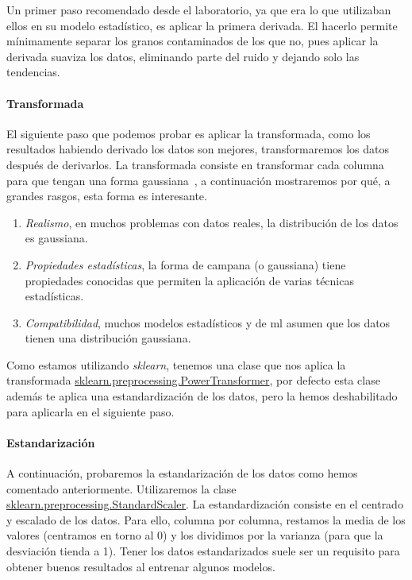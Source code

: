 Un primer paso recomendado desde el laboratorio, ya que era lo que utilizaban ellos en su modelo estadístico, es aplicar la primera derivada. El hacerlo permite mínimamente separar los granos contaminados de los que no, pues aplicar la derivada suaviza los datos, eliminando parte del ruido y dejando solo las tendencias.


\paragraph{Transformada}

El siguiente paso que podemos probar es aplicar la transformada, como los resultados habiendo derivado los datos son mejores, transformaremos los datos después de derivarlos. La transformada consiste en transformar cada columna para que tengan una forma gaussiana\ \cite{sklearnp39:online}, a continuación mostraremos por qué, a grandes rasgos, esta forma es interesante. \cite{TheRoleo87:online}

\begin{enumerate}
    \item \textit{Realismo}, en muchos problemas con datos reales, la distribución de los datos es gaussiana.
    \item \textit{Propiedades estadísticas}, la forma de campana (o gaussiana) tiene propiedades conocidas que permiten la aplicación de varias técnicas estadísticas.
    \item \textit{Compatibilidad}, muchos modelos estadísticos y de \gls{ml} asumen que los datos tienen una distribución gaussiana.
\end{enumerate}

Como estamos utilizando \textit{sklearn}, tenemos una clase que nos aplica la transformada \href{https://scikit-learn.org/stable/modules/generated/sklearn.preprocessing.PowerTransformer.html}{sklearn.preprocessing.PowerTransformer}, por defecto esta clase además te aplica una estandardización de los datos, pero la hemos deshabilitado para aplicarla en el siguiente paso. 


\paragraph{Estandarización}

A continuación, probaremos la estandarización de los datos como hemos comentado anteriormente. Utilizaremos la clase \href{https://scikit-learn.org/stable/modules/generated/sklearn.preprocessing.StandardScaler.html}{sklearn.preprocessing.StandardScaler}. La estandardización consiste en el centrado y escalado de los datos. Para ello, columna por columna, restamos la media de los valores (centramos en torno al 0) y los dividimos por la varianza (para que la desviación tienda a 1). Tener los datos estandarizados suele ser un requisito para obtener buenos resultados al entrenar algunos modelos.\ \cite{sklearnp24:online}


